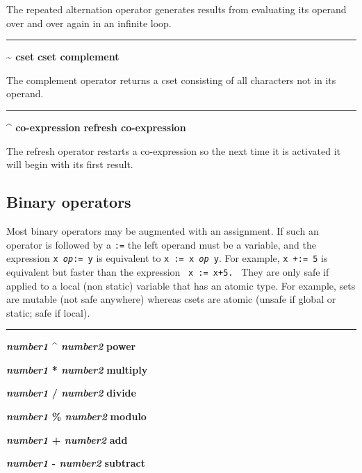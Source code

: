 \noindent
The repeated alternation operator generates
results from evaluating its operand over and over again in an infinite
loop.

\bigskip\hrule\vspace{0.1cm}
\noindent
{\bf \~{} cset } \hfill {\bf cset complement}

\noindent
The complement operator returns a cset
consisting of all characters not in its operand.

\bigskip\hrule\vspace{0.1cm}
\noindent
{\bf \^{} co{}-expression } \hfill {\bf refresh co{}-expression}

\noindent
{}The refresh operator restarts a
co-expression so the next time it is activated it will begin with its
first result.

\subsection*{Binary operators}

Most binary operators may be augmented with an
assignment. If such an operator is followed
by a \texttt{:=} the left operand must be a variable, and the
expression \texttt{x }\texttt{\textit{op}}\texttt{:= y} is equivalent
to \texttt{x := x }\texttt{\textit{op}}\texttt{ y}. For example,
\texttt{x +:= 5} is equivalent but faster than the expression
\ \texttt{x := x+5.}
 \
They are only safe if applied to a local (non static) variable that
has an atomic type. For example, sets are mutable (not safe anywhere)
whereas csets are atomic (unsafe if global or static; safe if local).

\bigskip\hrule\vspace{0.1cm}
\noindent
{\bf \textit{number1} \^{} \textit{number2} } \hfill {\bf power}
\index{power, exponent \^{}}

\noindent
{\bf \textit{number1} * \textit{number2} } \hfill {\bf multiply}

\noindent
{\bf \textit{number1} / \textit{number2} } \hfill {\bf divide}

\noindent
{\bf \textit{number1} \% \textit{number2} } \hfill {\bf modulo}

\noindent
{\bf \textit{number1} + \textit{number2} } \hfill {\bf add}

\noindent
{\bf \textit{number1} - \textit{number2} } \hfill {\bf subtract}

